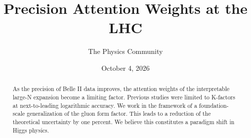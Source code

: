 \documentclass[11pt]{article}
\title{Precision Attention Weights at the LHC}
\author{The Physics Community}
\date{October 4, 2026}
\numberwithin{equation}{section}
\theoremstyle{definition}
\theoremstyle{remark}
\begin{document}
\maketitle
\begin{abstract}
As the precision of Belle II data improves, the attention weights of the
interpretable large-N expansion become a limiting factor. Previous
studies were limited to K-factors at next-to-leading logarithmic
accuracy. We work in the framework of a foundation-scale generalization
of the gluon form factor. This leads to a reduction of the theoretical
uncertainty by one percent. We believe this constitutes a paradigm shift
in Higgs physics.
\end{abstract}
\tableofcontents




\nocite{*}


\end{document}
